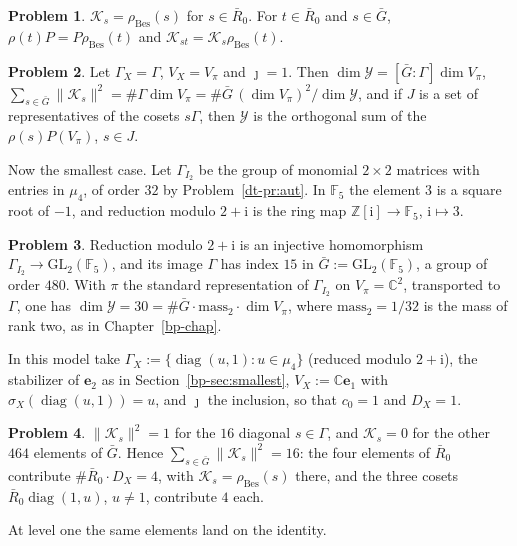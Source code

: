 \documentclass[reqno]{amsart}
\newcounter{chap}
\theoremstyle{definition}
\newtheorem{problem}{Problem}[section]
\theoremstyle{plain}
\theoremstyle{remark}
\newcommand{\Z}{\mathbb{Z}}
\newcommand{\C}{\mathbb{C}}
\newcommand{\F}{\mathbb{F}}
\newcommand{\ii}{\mathrm{i}}
\newcommand{\GL}{\mathrm{GL}}
\newcommand{\Gb}{\bar G}
\newcommand{\Rb}{\bar R_0}
\newcommand{\Yc}{\mathcal Y}
\newcommand{\Kc}{\mathcal K}
\newcommand{\rB}{\rho_{\mathrm{Bes}}}
\newcommand{\diag}{\operatorname{diag}}
\begin{document}
\begin{problem}\label{pr:model-bessel}
\(\Kc_s=\rB(s)\) for \(s\in\Rb\).  For \(t\in\Rb\) and \(s\in\Gb\), \(\rho(t)P=P\rB(t)\) and \(\Kc_{st}=\Kc_s\rB(t)\).
\end{problem}

\begin{problem}\label{pr:induced}
Let \(\Gamma_X=\Gamma\), \(V_X=V_\pi\) and \(\jmath=1\).  Then \(\dim\Yc=[\Gb:\Gamma]\dim V_\pi\), \(\sum_{s\in\Gb}\lVert\Kc_s\rVert^2=\#\Gamma\dim V_\pi=\#\Gb\,(\dim V_\pi)^2/\dim\Yc\), and if \(J\) is a set of representatives of the cosets \(s\Gamma\), then \(\Yc\) is the orthogonal sum of the \(\rho(s)P(V_\pi)\), \(s\in J\).
\end{problem}

Now the smallest case.  Let \(\Gamma_{I_2}\) be the group of monomial \(2\times2\) matrices with entries in \(\mu_4\), of order \(32\) by Problem~\ref{dt-pr:aut}.  In \(\F_5\) the element \(3\) is a square root of \(-1\), and reduction modulo \(2+\ii\) is the ring map \(\Z[\ii]\to\F_5\), \(\ii\mapsto3\).

\begin{problem}\label{pr:reduction}
Reduction modulo \(2+\ii\) is an injective homomorphism \(\Gamma_{I_2}\to\GL_2(\F_5)\), and its image \(\Gamma\) has index \(15\) in \(\Gb:=\GL_2(\F_5)\), a group of order \(480\).  With \(\pi\) the standard representation of \(\Gamma_{I_2}\) on \(V_\pi=\C^2\), transported to \(\Gamma\), one has \(\dim\Yc=30=\#\Gb\cdot\mathrm{mass}_2\cdot\dim V_\pi\), where \(\mathrm{mass}_2=1/32\) is the mass of rank two, as in Chapter~\ref{bp-chap}.
\end{problem}

In this model take \(\Gamma_X:=\{\diag(u,1):u\in\mu_4\}\) (reduced modulo \(2+\ii\)), the stabilizer of \(\mathbf e_2\) as in Section~\ref{bp-sec:smallest}, \(V_X:=\C\mathbf e_1\) with \(\sigma_X(\diag(u,1))=u\), and \(\jmath\) the inclusion, so that \(c_0=1\) and \(D_X=1\).

\begin{problem}\label{pr:level-toy}
\(\lVert\Kc_s\rVert^2=1\) for the \(16\) diagonal \(s\in\Gamma\), and \(\Kc_s=0\) for the other \(464\) elements of \(\Gb\).  Hence \(\sum_{s\in\Gb}\lVert\Kc_s\rVert^2=16\): the four elements of \(\Rb\) contribute \(\#\Rb\cdot D_X=4\), with \(\Kc_s=\rB(s)\) there, and the three cosets \(\Rb\diag(1,u)\), \(u\ne1\), contribute \(4\) each.
\end{problem}

At level one the same elements land on the identity.
\end{document}

